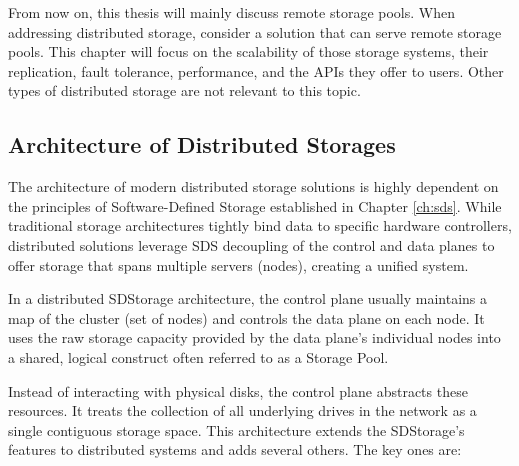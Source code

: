 \vspace{1.5em}
From now on, this thesis will mainly discuss remote storage pools. When addressing distributed storage, consider a solution that can serve remote storage pools. This chapter will focus on the scalability of those storage systems, their replication, fault tolerance, performance, and the APIs they offer to users. Other types of distributed storage are not relevant to this topic.

\subsection{Architecture of Distributed Storages}
The architecture of modern distributed storage solutions is highly dependent on the principles of Software-Defined Storage established in Chapter \ref{ch:sds}. While traditional storage architectures tightly bind data to specific hardware controllers, distributed solutions leverage SDS decoupling of the control and data planes to offer storage that spans multiple servers (nodes), creating a unified system.

In a distributed SDStorage architecture, the control plane usually maintains a map of the cluster (set of nodes) and controls the data plane on each node. It uses the raw storage capacity provided by the data plane's individual nodes into a shared, logical construct often referred to as a Storage Pool.

Instead of interacting with physical disks, the control plane abstracts these resources. It treats the collection of all underlying drives in the network as a single contiguous storage space. This architecture extends the SDStorage's features to distributed systems and adds several others. The key ones are:

